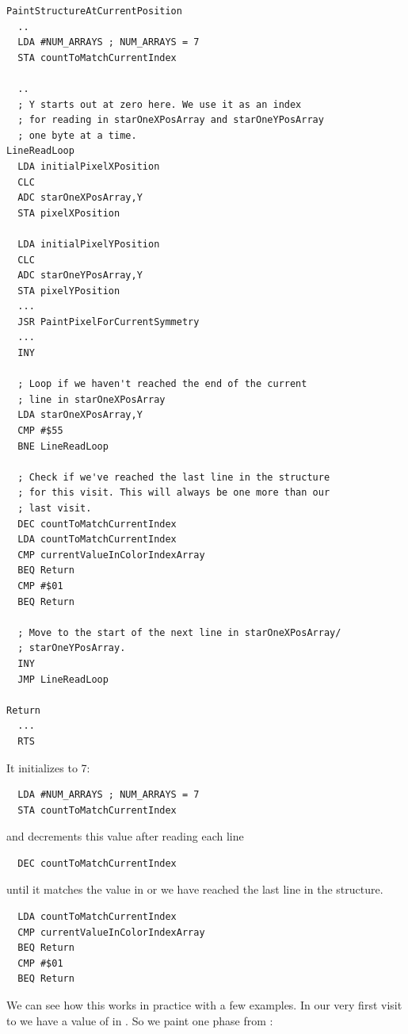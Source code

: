 \begin{lstlisting}
PaintStructureAtCurrentPosition   
  ..
  LDA #NUM_ARRAYS ; NUM_ARRAYS = 7
  STA countToMatchCurrentIndex

  ..
  ; Y starts out at zero here. We use it as an index
  ; for reading in starOneXPosArray and starOneYPosArray
  ; one byte at a time.
LineReadLoop   
  LDA initialPixelXPosition
  CLC 
  ADC starOneXPosArray,Y
  STA pixelXPosition

  LDA initialPixelYPosition
  CLC 
  ADC starOneYPosArray,Y
  STA pixelYPosition
  ...
  JSR PaintPixelForCurrentSymmetry
  ...
  INY 

  ; Loop if we haven't reached the end of the current
  ; line in starOneXPosArray
  LDA starOneXPosArray,Y
  CMP #$55
  BNE LineReadLoop

  ; Check if we've reached the last line in the structure
  ; for this visit. This will always be one more than our 
  ; last visit.
  DEC countToMatchCurrentIndex
  LDA countToMatchCurrentIndex
  CMP currentValueInColorIndexArray
  BEQ Return
  CMP #$01
  BEQ Return

  ; Move to the start of the next line in starOneXPosArray/
  ; starOneYPosArray.
  INY 
  JMP LineReadLoop

Return   
  ...
  RTS 
\end{lstlisting}

It initializes  to 7:
\begin{lstlisting}
  LDA #NUM_ARRAYS ; NUM_ARRAYS = 7
  STA countToMatchCurrentIndex
\end{lstlisting}

and decrements this value after reading each line 
\begin{lstlisting}
  DEC countToMatchCurrentIndex
\end{lstlisting}

until it matches the value in  or we have reached the last line in the structure.

\begin{lstlisting}
  LDA countToMatchCurrentIndex
  CMP currentValueInColorIndexArray
  BEQ Return
  CMP #$01
  BEQ Return
\end{lstlisting}

We can see how this works in practice with a few examples. In our very first visit to 
we have a value of  in . So we paint one phase from :

